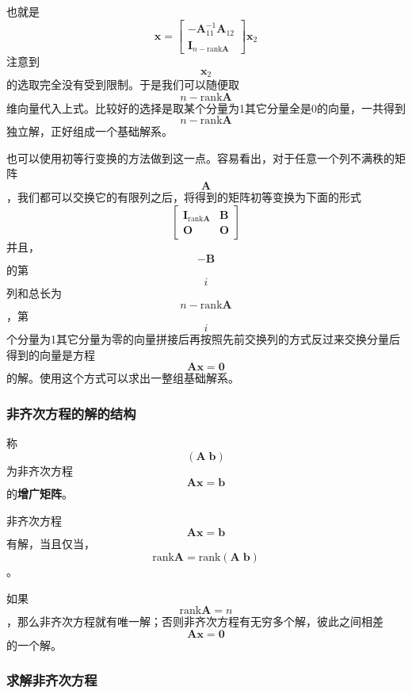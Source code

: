 也就是 \[
\boldsymbol{x} = \left[
    \begin{matrix}
        - \boldsymbol{A}_{11}^{-1} \boldsymbol{A}_{12} \\
        \boldsymbol{I}_{n-\mathrm{rank}\boldsymbol{A}}
    \end{matrix}    
\right] \boldsymbol{x}_2
\]
注意到$$\boldsymbol{x}_2$$的选取完全没有受到限制。于是我们可以随便取$$n-\mathrm{rank}\boldsymbol{A}$$维向量代入上式。比较好的选择是取某个分量为1其它分量全是0的向量，一共得到$$n-\mathrm{rank}\boldsymbol{A}$$独立解，正好组成一个基础解系。

也可以使用初等行变换的方法做到这一点。容易看出，对于任意一个列不满秩的矩阵$$\boldsymbol{A}$$，我们都可以交换它的有限列之后，将得到的矩阵初等变换为下面的形式
\[
\left[
    \begin{matrix}
        \boldsymbol{I}_{\mathrm{rank}\boldsymbol{A}} & \boldsymbol{B} \\
        \boldsymbol{O} & \boldsymbol{O}
    \end{matrix}    
\right]
\]
并且，$$-\boldsymbol{B}$$的第$$i$$列和总长为$$n-\mathrm{rank}\boldsymbol{A}$$，第$$i$$个分量为1其它分量为零的向量拼接后再按照先前交换列的方式反过来交换分量后得到的向量是方程$$\boldsymbol{A} \boldsymbol{x} = \boldsymbol{0}$$的解。使用这个方式可以求出一整组基础解系。

\hypertarget{ux975eux9f50ux6b21ux65b9ux7a0bux7684ux89e3ux7684ux7ed3ux6784}{%
\subsubsection{非齐次方程的解的结构}\label{ux975eux9f50ux6b21ux65b9ux7a0bux7684ux89e3ux7684ux7ed3ux6784}}

称$$(\boldsymbol{A} \; \boldsymbol{b})$$为非齐次方程$$\boldsymbol{A} \boldsymbol{x} = \boldsymbol{b}$$的\textbf{增广矩阵}。

非齐次方程$$\boldsymbol{A} \boldsymbol{x} = \boldsymbol{b}$$有解，当且仅当，$$\mathrm{rank}\boldsymbol{A} = \mathrm{rank}(\boldsymbol{A} \; \boldsymbol{b})$$。

如果$$\mathrm{rank}\boldsymbol{A} = n$$，那么非齐次方程就有唯一解；否则非齐次方程有无穷多个解，彼此之间相差$$\boldsymbol{A} \boldsymbol{x} = \boldsymbol{0}$$的一个解。

\hypertarget{ux6c42ux89e3ux975eux9f50ux6b21ux65b9ux7a0b}{%
\subsubsection{求解非齐次方程}\label{ux6c42ux89e3ux975eux9f50ux6b21ux65b9ux7a0b}}

